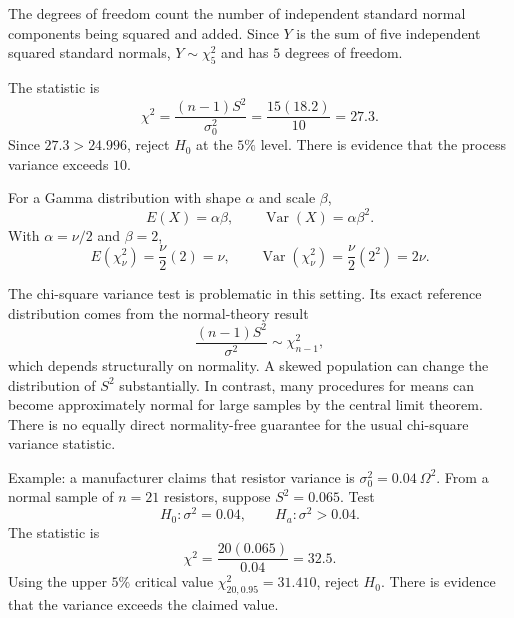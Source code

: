\begin{solproblema}[prob:66b286b]
The degrees of freedom count the number of independent standard normal components being squared and added. Since $Y$ is the sum of five independent squared standard normals, $Y\sim \chi^2_5$ and has $5$ degrees of freedom.
\end{solproblema}

\begin{solproblema}[prob:94c69e2]
The statistic is
\[
	\chi^2=\frac{(n-1)S^2}{\sigma_0^2}=\frac{15(18.2)}{10}=27.3.
\]
Since $27.3>24.996$, reject $H_0$ at the $5\%$ level. There is evidence that the process variance exceeds $10$.
\end{solproblema}

\begin{solproblema}[prob:b08d077]
For a Gamma distribution with shape $\alpha$ and scale $\beta$,
\[
	E(X)=\alpha\beta,\qquad \operatorname{Var}(X)=\alpha\beta^2.
\]
With $\alpha=\nu/2$ and $\beta=2$,
\[
	E(\chi^2_\nu)=\frac{\nu}{2}(2)=\nu,\qquad
	\operatorname{Var}(\chi^2_\nu)=\frac{\nu}{2}(2^2)=2\nu.
\]
\end{solproblema}

\begin{solproblema}[prob:db05590]
The chi-square variance test is problematic in this setting. Its exact reference distribution comes from the normal-theory result
\[
	\frac{(n-1)S^2}{\sigma^2}\sim \chi^2_{n-1},
\]
which depends structurally on normality. A skewed population can change the distribution of $S^2$ substantially. In contrast, many procedures for means can become approximately normal for large samples by the central limit theorem. There is no equally direct normality-free guarantee for the usual chi-square variance statistic.
\end{solproblema}

\begin{solproblema}[prob:501e850]
Example: a manufacturer claims that resistor variance is $\sigma_0^2=0.04\ \Omega^2$. From a normal sample of $n=21$ resistors, suppose $S^2=0.065$. Test
\[
	H_0:\sigma^2=0.04,\qquad H_a:\sigma^2>0.04.
\]
The statistic is
\[
	\chi^2=\frac{20(0.065)}{0.04}=32.5.
\]
Using the upper $5\%$ critical value $\chi^2_{20,0.95}=31.410$, reject $H_0$. There is evidence that the variance exceeds the claimed value.
\end{solproblema}
